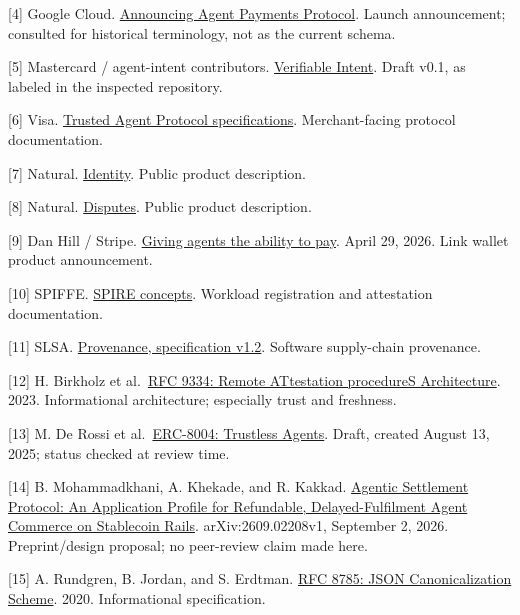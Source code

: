 \documentclass[
  11pt,
  letterpaper,
]{article}
\begin{document}
{[}4{]} Google Cloud.
\href{https://cloud.google.com/blog/products/ai-machine-learning/announcing-agents-to-payments-ap2-protocol}{Announcing
Agent Payments Protocol}. Launch announcement; consulted for historical
terminology, not as the current schema.

{[}5{]} Mastercard / agent-intent contributors.
\href{https://github.com/agent-intent/verifiable-intent/}{Verifiable
Intent}. Draft v0.1, as labeled in the inspected repository.

{[}6{]} Visa.
\href{https://developer.visa.com/capabilities/trusted-agent-protocol/trusted-agent-protocol-specifications}{Trusted
Agent Protocol specifications}. Merchant-facing protocol documentation.

{[}7{]} Natural. \href{https://www.natural.com/identity}{Identity}.
Public product description.

{[}8{]} Natural. \href{https://www.natural.com/disputes}{Disputes}.
Public product description.

{[}9{]} Dan Hill / Stripe.
\href{https://stripe.com/blog/giving-agents-the-ability-to-pay}{Giving
agents the ability to pay}. April 29, 2026. Link wallet product
announcement.

{[}10{]} SPIFFE.
\href{https://spiffe.io/docs/latest/spire-about/spire-concepts/}{SPIRE
concepts}. Workload registration and attestation documentation.

{[}11{]} SLSA. \href{https://slsa.dev/spec/v1.2/provenance}{Provenance,
specification v1.2}. Software supply-chain provenance.

{[}12{]} H. Birkholz et
al.~\href{https://www.rfc-editor.org/rfc/rfc9334}{RFC 9334: Remote
ATtestation procedureS Architecture}. 2023. Informational architecture;
especially trust and freshness.

{[}13{]} M. De Rossi et
al.~\href{https://eips.ethereum.org/EIPS/eip-8004}{ERC-8004: Trustless
Agents}. Draft, created August 13, 2025; status checked at review time.

{[}14{]} B. Mohammadkhani, A. Khekade, and R. Kakkad.
\href{https://arxiv.org/html/2609.02208v1}{Agentic Settlement Protocol:
An Application Profile for Refundable, Delayed-Fulfilment Agent Commerce
on Stablecoin Rails}. arXiv:2609.02208v1, September 2, 2026.
Preprint/design proposal; no peer-review claim made here.

{[}15{]} A. Rundgren, B. Jordan, and S. Erdtman.
\href{https://www.rfc-editor.org/rfc/rfc8785}{RFC 8785: JSON
Canonicalization Scheme}. 2020. Informational specification.
\end{document}
